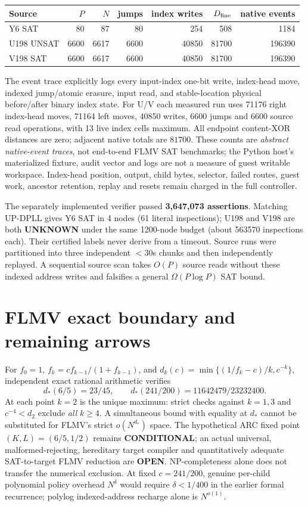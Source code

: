 \documentclass[10pt]{article}
\begin{document}
\begin{center}\small
\begin{tabular}{lrrrrrr}
\toprule
Source & $P$ & $N$ & jumps & index writes & $D_{\rm fine}$ & native events\\\midrule
Y6 SAT&80&87&80&254&508&1184\\
U198 UNSAT&6600&6617&6600&40850&81700&196390\\
V198 SAT&6600&6617&6600&40850&81700&196390\\\bottomrule
\end{tabular}
\end{center}
The event trace explicitly logs every input-index one-bit write, index-head move, indexed jump/atomic erasure, input read, and stable-location physical before/after binary index state. For U/V each measured run uses 71176 right index-head moves, 71164 left moves, 40850 writes, 6600 jumps and 6600 source read operations, with 13 live index cells maximum. All endpoint content-XOR distances are zero; adjacent native totals are $81700$. These counts are \emph{abstract native-event traces}, not end-to-end FLMV SAT benchmarks; the Python host's materialized fixture, audit vector and logs are not a measure of guest writable workspace. Index-head position, output, child bytes, selector, failed routes, guest work, ancestor retention, replay and resets remain charged in the full controller.

The separately implemented verifier passed \textbf{3,647,073 assertions}. Matching UP-DPLL gives Y6 SAT in 4 nodes (61 literal inspections); U198 and V198 are both \textbf{UNKNOWN} under the same 1200-node budget (about 563570 inspections each). Their certified labels never derive from a timeout. Source runs were partitioned into three independent $<30$s chunks and then independently replayed. A sequential source scan takes $O(P)$ source reads without these indexed address writes and falsifies a general $\Omega(P\log P)$ SAT bound.

\section{FLMV exact boundary and remaining arrows}
For $f_0=1$, $f_k=cf_{k-1}/(1+f_{k-1})$, and $d_k(c)=\min\{(1/f_k-c)/k,c^{-k}\}$, independent exact rational arithmetic verifies
\[
\boxed{d_*(6/5)=23/45,\qquad d_*(241/200)=11642479/23232400}.
\]
At each point $k=2$ is the unique maximum: strict checks against $k=1,3$ and $c^{-4}<d_2$ exclude \emph{all} $k\ge4$. A simultaneous bound with equality at $d_*$ cannot be substituted for FLMV's strict $o(N^{d_*})$ space. The hypothetical ARC fixed point $(K,L)=(6/5,1/2)$ remains \textbf{CONDITIONAL}; an actual universal, malformed-rejecting, hereditary target compiler and quantitatively adequate SAT-to-target FLMV reduction are \textbf{OPEN}. NP-completeness alone does not transfer the numerical exclusion. At fixed $c=241/200$, genuine per-child polynomial policy overhead $N^\delta$ would require $\delta<1/400$ in the earlier formal recurrence; polylog indexed-address recharge alone is $N^{o(1)}$.
\end{document}
